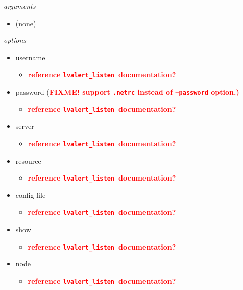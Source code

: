 \documentclass{article}
\newcommand{\FIXME}[1]{\textcolor{red}{\textbf{#1}}}
\newcommand{\lvalertListen}{\texttt{lvalert\_listen}}
\begin{document}
\vspace{0.5cm}
\noindent
\textit{arguments}
\begin{itemize}
    \item{(none)}
\end{itemize}

\noindent
\textit{options}

\begin{itemize}
    \item{username
        \begin{itemize}
            \item{\FIXME{reference \lvalertListen~documentation?}}
        \end{itemize}
         }
    \item{password (\FIXME{FIXME! support \texttt{.netrc} instead of \texttt{--password} option.)}
        \begin{itemize}
            \item{\FIXME{reference \lvalertListen~documentation?}}
        \end{itemize}
         }
    \item{server
        \begin{itemize}
            \item{\FIXME{reference \lvalertListen~documentation?}}
        \end{itemize}
         }
    \item{resource
        \begin{itemize}
            \item{\FIXME{reference \lvalertListen~documentation?}}
        \end{itemize}
         }
    \item{config-file
        \begin{itemize}
            \item{\FIXME{reference \lvalertListen~documentation?}}
        \end{itemize}
         }
    \item{show
        \begin{itemize}
            \item{\FIXME{reference \lvalertListen~documentation?}}
        \end{itemize}
         }
    \item{node
        \begin{itemize}
            \item{\FIXME{reference \lvalertListen~documentation?}}
        \end{itemize}
}
\end{itemize}
\end{document}
